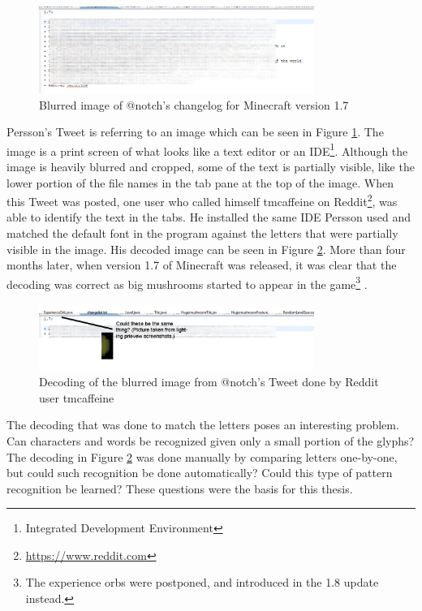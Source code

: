 \newpage
\begin{figure}[h]
    \centering
    \includegraphics[width=0.8\textwidth]{fig/chapter1/notch_eclipse.jpg}
    \caption{Blurred image of @notch's changelog for Minecraft version 1.7}
    \label{fig:notch_imgur}
\end{figure}

Persson's Tweet is referring to an image which can be seen in Figure \ref{fig:notch_imgur}. The image is a print screen of what looks like a text editor or an IDE\footnote{Integrated Development Environment}. Although the image is heavily blurred and cropped, some of the text is partially visible, like the lower portion of the file names in the tab pane at the top of the image. When this Tweet was posted, one user who called himself tmcaffeine on Reddit\footnote{\url{https://www.reddit.com}}, was able to identify the text in the tabs. He installed the same IDE Persson used and matched the default font in the program against the letters that were partially visible in the image. His decoded image can be seen in Figure \ref{fig:notch_eclipse_decoded}. More than four months later, when version 1.7 of Minecraft was released, it was clear that the decoding was correct as big mushrooms started to appear in the game\footnote{The experience orbs were postponed, and introduced in the 1.8 update instead.} \citep{misc-minecraft.172-changelog}.

\begin{figure}[ht]
    \centering
    \captionsetup{justification=centering}
    \includegraphics[width=0.8\textwidth]{fig/chapter1/notch_eclipse_decoded.jpg}
    \caption{Decoding of the blurred image from @notch's Tweet done by Reddit user tmcaffeine}
    \label{fig:notch_eclipse_decoded}
\end{figure}

The decoding that was done to match the letters poses an interesting problem. Can characters and words be recognized given only a small portion of the glyphs? The decoding in Figure \ref{fig:notch_eclipse_decoded} was done manually by comparing letters one-by-one, but could such recognition be done automatically? Could this type of pattern recognition be learned? These questions were the basis for this thesis.

